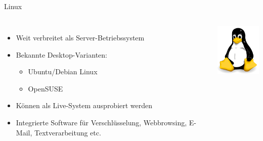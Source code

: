 \documentclass[12pt]{beamer}
\begin{document}
\subsection{}
\begin{frame}{Linux}

\begin{columns}


\column{8cm}
\begin{itemize}
\item Weit verbreitet als Server-Betriebssystem
\item Bekannte Desktop-Varianten: 

\begin{itemize}
\item Ubuntu/Debian Linux
\item OpenSUSE
\end{itemize}
\item Können als Live-System ausprobiert werden
\item Integrierte Software für Verschlüsselung, Webbrowsing, E-Mail, Textverarbeitung
etc.
\end{itemize}

\column{6cm}


\begin{center}
\includegraphics[width=3cm]{img/Tux}
\par\end{center}

\end{columns}
\end{frame}
\end{document}
